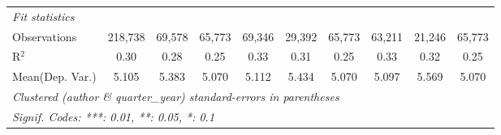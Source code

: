 \begin{tabular}{lccccccccc}
   \midrule
   \emph{Fit statistics}\\
   Observations                           & 218,738       & 69,578       & 65,773        & 69,346        & 29,392        & 65,773        & 63,211        & 21,246  & 65,773\\  
   R$^2$                                  & 0.30          & 0.28         & 0.25          & 0.33          & 0.31          & 0.25          & 0.33          & 0.32    & 0.25\\  
Mean(Dep. Var.) & 5.105 & 5.383 & 5.070 & 5.112 & 5.434 & 5.070 & 5.097 & 5.569 & 5.070 \\
   \midrule \midrule
   \multicolumn{10}{l}{\emph{Clustered (author \& quarter\_year) standard-errors in parentheses}}\\
   \multicolumn{10}{l}{\emph{Signif. Codes: ***: 0.01, **: 0.05, *: 0.1}}\\
\end{tabular}
\par\endgroup
